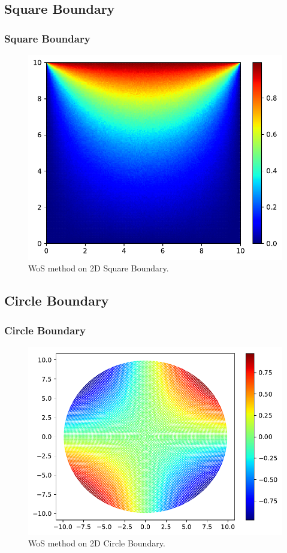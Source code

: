 \documentclass{beamer}
\begin{document}

\subsection{Square Boundary}

\begin{frame}
\frametitle{Square Boundary}
\begin{figure}[htbp]
    \centering
    \includegraphics[width=.7\textwidth]{./figs/wos_s}
    \caption{\label{fig:wos_s} WoS method on 2D Square Boundary.}
\end{figure}
\end{frame}


\subsection{Circle Boundary}

\begin{frame}
\frametitle{Circle Boundary}
\begin{figure}[htbp]
    \centering
    \includegraphics[width=.75\textwidth]{./figs/wos_c}
    \caption{\label{fig:wos_c} WoS method on 2D Circle Boundary.}
\end{figure}
\end{frame}
\end{document}
